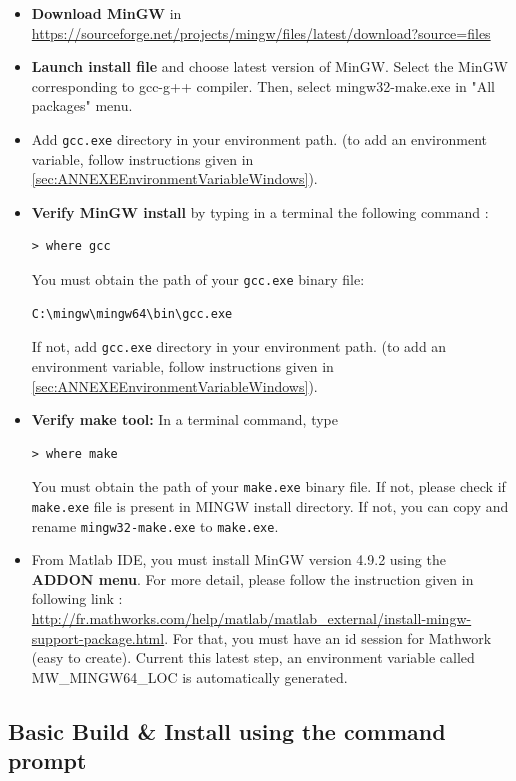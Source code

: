 \begin{itemize}
\item \textbf{Download MinGW} in \url{https://sourceforge.net/projects/mingw/files/latest/download?source=files}
\item \textbf{Launch install file} and choose latest version of MinGW. Select the MinGW corresponding to gcc-g++ compiler. Then, select mingw32-make.exe in "All packages" menu. 
\item Add \texttt{gcc.exe} directory in your environment path. 
(to add an environment variable, follow instructions given in \ref{sec:ANNEXEEnvironmentVariableWindows}). 
\item \textbf{Verify MinGW install} by typing in a terminal the following command : 

\lstset{style=customBash}
\begin{lstlisting}
> where gcc
\end{lstlisting}
You must obtain the path of your \texttt{gcc.exe} binary file: 
\begin{lstlisting}
C:\mingw\mingw64\bin\gcc.exe
\end{lstlisting}

If not, add \texttt{gcc.exe} directory in your environment path. 
(to add an environment variable, follow instructions given in \ref{sec:ANNEXEEnvironmentVariableWindows}). 

\item \textbf{Verify make tool:} In a terminal command, type
\begin{lstlisting}
> where make
\end{lstlisting}
You must obtain the path of your \texttt{make.exe} binary file. 
If not, please check if \texttt{make.exe} file is present in MINGW install directory. If not, you can copy and rename \texttt{mingw32-make.exe} to \texttt{make.exe}.

\item From Matlab IDE, you must install MinGW version 4.9.2 using the \textbf{ADDON menu}. For more detail, please follow the instruction given in following link :  
\url{http://fr.mathworks.com/help/matlab/matlab_external/install-mingw-support-package.html}. For that, you must have an id session for Mathwork (easy to create). Current this latest step, an environment variable called MW\_MINGW64\_LOC is automatically generated. 
\end{itemize}


\subsection{Basic Build \& Install using the command prompt}
\label{sec:WinMinGWBasicInstall}


